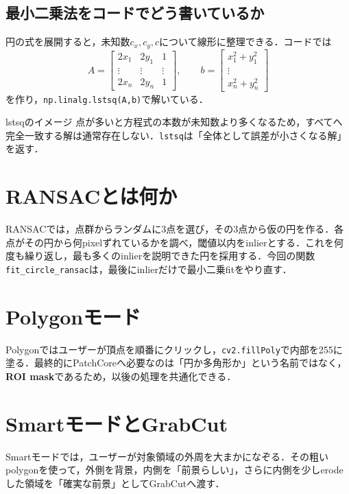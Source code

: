 \documentclass[a4paper,11pt]{ltjsreport}
\begin{document}
\subsection{最小二乗法をコードでどう書いているか}
円の式を展開すると，未知数\(c_x,c_y,c\)について線形に整理できる．コードでは
\[
A=\begin{bmatrix}
2x_1 & 2y_1 & 1\\
\vdots & \vdots & \vdots\\
2x_n & 2y_n & 1
\end{bmatrix},\qquad
b=\begin{bmatrix}
x_1^2+y_1^2\\
\vdots\\
x_n^2+y_n^2
\end{bmatrix}
\]
を作り，\texttt{np.linalg.lstsq(A,b)}で解いている．

\begin{pointbox}{lstsqのイメージ}
点が多いと方程式の本数が未知数より多くなるため，すべてへ完全一致する解は通常存在しない．\texttt{lstsq}は「全体として誤差が小さくなる解」を返す．
\end{pointbox}

\section{RANSACとは何か}
RANSACでは，点群からランダムに3点を選び，その3点から仮の円を作る．各点がその円から何pixelずれているかを調べ，閾値以内をinlierとする．これを何度も繰り返し，最も多くのinlierを説明できた円を採用する．今回の関数\texttt{fit\_circle\_ransac}は，最後にinlierだけで最小二乗fitをやり直す．

\section{Polygonモード}
Polygonではユーザーが頂点を順番にクリックし，\texttt{cv2.fillPoly}で内部を255に塗る．最終的にPatchCoreへ必要なのは「円か多角形か」という名前ではなく，\textbf{ROI mask}であるため，以後の処理を共通化できる．

\section{SmartモードとGrabCut}
Smartモードでは，ユーザーが対象領域の外周を大まかになぞる．その粗いpolygonを使って，外側を背景，内側を「前景らしい」，さらに内側を少しerodeした領域を「確実な前景」としてGrabCutへ渡す．
\end{document}
